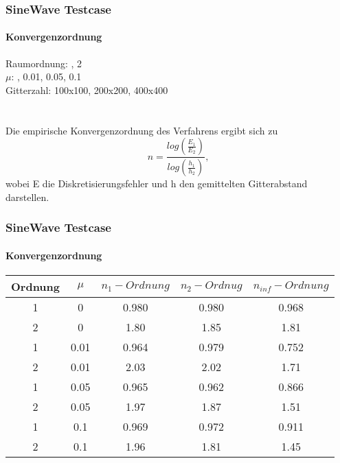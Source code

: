 \documentclass[
	11pt, %
	aspectratio=169, %
]{beamer}
\begin{document}
\begin{frame}
	\frametitle{SineWave Testcase}
	\framesubtitle{Konvergenzordnung}
Raumordnung: , 2\\
$\mu$: \quad \quad \quad \quad \quad \quad {}, 0.01, 0.05, 0.1\\
Gitterzahl: \quad \quad \quad 100x100, 200x200, 400x400\\ \\ \\
Die empirische Konvergenzordnung des Verfahrens ergibt sich zu
$$n=\frac{log(\frac{E_1}{E_2})}{log(\frac{h_1}{h_2})},$$
wobei E die Diskretisierungsfehler und h den gemittelten Gitterabstand darstellen.

\end{frame}
\begin{frame}
	\frametitle{SineWave Testcase}
	\framesubtitle{Konvergenzordnung}

	\begin{tabular}{|c|c|c|c|c|}
		\hline
		Ordnung & $\mu$  & $n_1-Ordnung$& $n_2-Ordnug$& $n_{inf}-Ordnung$\\
		\hline
		1 & 0 & 0.980 & 0.980 & 0.968 \\
		\hline
		2 & 0 & 1.80 & 1.85 & 1.81 \\
		\hline
		1 & 0.01 & 0.964 & 0.979 & 0.752 \\
		\hline
		2 & 0.01 & 2.03& 2.02 & 1.71 \\
		\hline
		1 & 0.05 & 0.965& 0.962 & 0.866 \\
		\hline
		2 & 0.05 &1.97 & 1.87 & 1.51 \\
		\hline
		1 & 0.1 & 0.969& 0.972 & 0.911 \\
		\hline
		2 & 0.1 & 1.96& 1.81 & 1.45 \\
		\hline
		\end{tabular}

	\end{frame}
\end{document}
